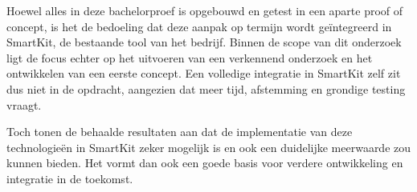 Hoewel alles in deze bachelorproef is opgebouwd en getest in een aparte proof of concept, is het de bedoeling dat deze aanpak op termijn wordt geïntegreerd in SmartKit, de bestaande tool van het bedrijf. Binnen de scope van dit onderzoek ligt de focus echter op het uitvoeren van een verkennend onderzoek en het ontwikkelen van een eerste concept. Een volledige integratie in SmartKit zelf zit dus niet in de opdracht, aangezien dat meer tijd, afstemming en grondige testing vraagt.

Toch tonen de behaalde resultaten aan dat de implementatie van deze technologieën in SmartKit zeker mogelijk is en ook een duidelijke meerwaarde zou kunnen bieden. Het vormt dan ook een goede basis voor verdere ontwikkeling en integratie in de toekomst.
